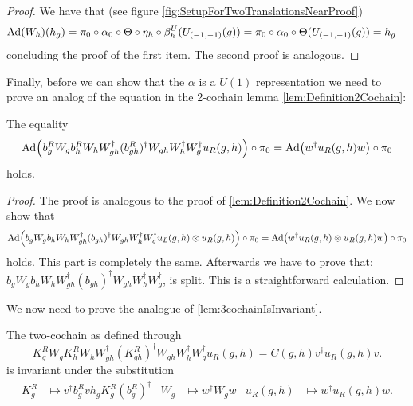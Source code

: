 \documentclass[11pt,a4paper,twoside]{article}
\numberwithin{equation}{section}
\begin{document}
	\begin{proof}
		We have that (see figure \ref{fig:SetupForTwoTranslationsNearProof})
		\begin{align}
			\Ad{W_h}(h_g)&=\pi_0\circ\alpha_0\circ\Theta\circ\eta_h\circ\beta_h^U(U_{(-1,-1)}(g))=\pi_0\circ\alpha_0\circ\Theta(U_{(-1,-1)}(g))=h_g
		\end{align}
		concluding the proof of the first item. The second proof is analogous.
	\end{proof}
	Finally, before we can show that the $\alpha$ is a $U(1)$ representation we need to prove an analog of the equation in the 2-cochain lemma \ref{lem:Definition2Cochain}:
	\begin{lemma}\label{lem:translating_u_R_To_The_Right_identity}
		The equality
		\begin{equation}
			\Ad{b_g^R W_g b_h^R W_h W_{gh}^\dagger (b_{gh}^R)^\dagger W_{gh}W_h^\dagger W_g^\dagger u_R(g,h)}\circ\pi_0=\Ad{w^\dagger u_R(g,h) w}\circ\pi_0
		\end{equation}
		holds.
	\end{lemma}
	\begin{proof}
		The proof is analogous to the proof of \ref{lem:Definition2Cochain}. We now show that
		\begin{equation}
			\Ad{b_g W_g b_h W_h W_{gh}^\dagger (b_{gh})^\dagger W_{gh}W_h^\dagger W_g^\dagger u_L(g,h)\otimes u_R(g,h)}\circ\pi_0=\Ad{w^\dagger u_R(g,h)\otimes u_R(g,h) w}\circ\pi_0
		\end{equation}
		holds. This part is completely the same. Afterwards we have to prove that: $b_g W_g b_h W_h W_{gh}^\dagger (b_{gh})^\dagger W_{gh}W_h^\dagger W_g^\dagger$, is split. This is a straightforward calculation.
	\end{proof}
	We now need to prove the analogue of \ref{lem:3cochainIsInvariant}.
	\begin{lemma}\label{lem:2cochainIsInvariant}
		The two-cochain as defined through
		\begin{equation}\label{eq:Definition2Cochain2TranslationSectionAppendix}
			K_g^RW_gK_h^RW_hW_{gh}^\dagger(K_{gh}^R)^\dagger W_{gh}W_{h}^\dagger W_g^\dagger u_R(g,h)=C(g,h)v^\dagger u_R(g,h)v.
		\end{equation}
		is invariant under the substitution
		\begin{align}
			K_g^R&\mapsto v^\dagger b_g^R v h_g K_g^R (b_g^R)^\dagger&W_g&\mapsto w^\dagger W_g w&u_R(g,h)&\mapsto w^\dagger u_R(g,h)w.
		\end{align}
	\end{lemma}
\end{document}
